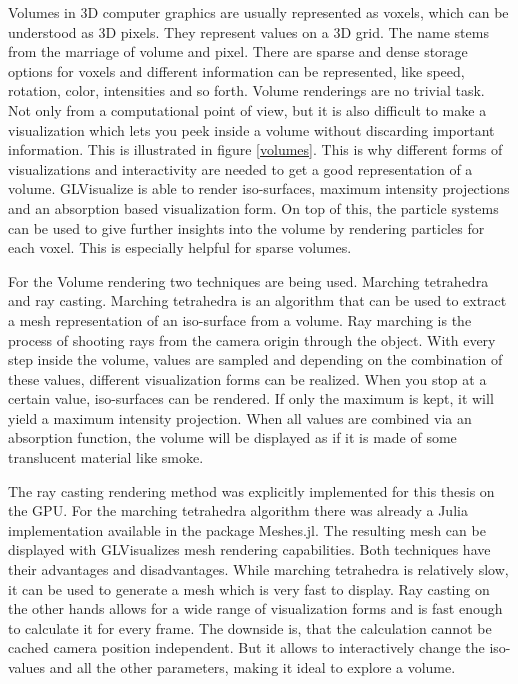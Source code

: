 Volumes in 3D computer graphics are usually represented as voxels, which can be understood as 3D pixels. 
They represent values on a 3D grid. The name stems from the marriage of volume and pixel.
There are sparse and dense storage options for voxels and different information can be represented, like speed, rotation, color, intensities and so forth.
Volume renderings are no trivial task. Not only from a computational point of view, but it is also difficult to make a visualization which lets you peek inside a volume without discarding important information. This is illustrated in figure \cref{volumes}.
This is why different forms of visualizations and interactivity are needed to get a good representation of a volume.
GLVisualize is able to render iso-surfaces, maximum intensity projections and an absorption based visualization form. 
On top of this, the particle systems can be used to give further insights into the volume by rendering particles for each voxel. This is especially helpful for sparse volumes.

For the Volume rendering two techniques are being used. 
Marching tetrahedra and ray casting\cite{marques2009gpu}. 
Marching tetrahedra is an algorithm that can be used to extract a mesh representation of an iso-surface from a volume.
Ray marching is the process of shooting rays from the camera origin through the object.
With every step inside the volume, values are sampled and depending on the combination of these values, different visualization forms can be realized. When you stop at a certain value, iso-surfaces can be rendered. 
If only the maximum is kept, it will yield a maximum intensity projection. 
When all values are combined via an absorption function, the volume will be displayed as if it is made of some translucent material like smoke.

The ray casting rendering method was explicitly implemented for this thesis on the GPU. For the marching tetrahedra algorithm there was already a Julia implementation available in the package Meshes.jl\cite{Tedrahedra}. The resulting mesh can be displayed with GLVisualizes mesh rendering capabilities.
Both techniques have their advantages and disadvantages. 
While marching tetrahedra is relatively slow, it can be used to generate a mesh which is very fast to display. 
Ray casting on the other hands allows for a wide range of visualization forms and is fast enough to calculate it for every frame. The downside is, that the calculation cannot be cached camera position independent. But it allows to interactively change the iso-values and all the other parameters, making it ideal to explore a volume.
 


